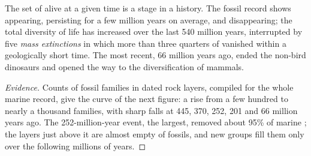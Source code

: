 \begin{proposition}\label{prop:g10:biodiversity-scales:changes}
The set of  alive at a given time is a stage in a history. The
fossil record shows  appearing, persisting for a few million
years on average, and disappearing; the total diversity of life has
increased over the last 540 million years, interrupted by five
\emph{mass extinctions} in which more than
three quarters of  vanished within a geologically short time.
The most recent, 66 million years ago, ended the non-bird dinosaurs
and opened the way to the diversification of mammals.
\end{proposition}
\begin{proof}[Evidence]
Counts of fossil families in dated rock layers, compiled for the whole
marine record, give the curve of the next figure: a rise from a few
hundred to nearly a thousand families, with sharp falls at 445, 370,
252, 201 and 66 million years ago. The 252-million-year event, the
largest, removed about 95\% of marine ; the layers just above
it are almost empty of fossils, and new groups fill them only over the
following millions of years.
\end{proof}

